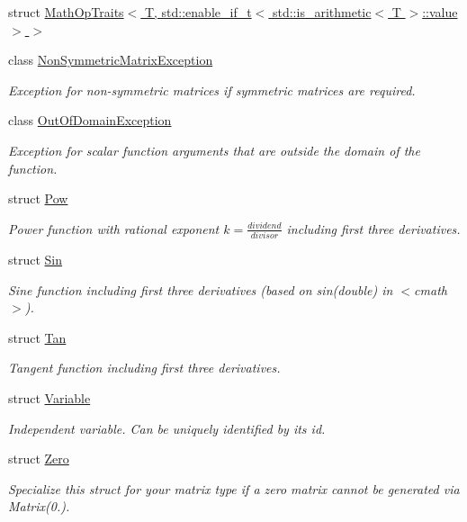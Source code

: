 \begin{DoxyCompactItemize}
\item 
struct \hyperlink{structFunG_1_1MathOpTraits_3_01T_00_01std_1_1enable__if__t_3_01std_1_1is__arithmetic_3_01T_01_4_1_1value_01_4_01_4}{Math\+Op\+Traits$<$ T, std\+::enable\+\_\+if\+\_\+t$<$ std\+::is\+\_\+arithmetic$<$ T $>$\+::value $>$ $>$}
\item 
class \hyperlink{classFunG_1_1NonSymmetricMatrixException}{Non\+Symmetric\+Matrix\+Exception}
\begin{DoxyCompactList}\small\item\em Exception for non-\/symmetric matrices if symmetric matrices are required. \end{DoxyCompactList}\item 
class \hyperlink{classFunG_1_1OutOfDomainException}{Out\+Of\+Domain\+Exception}
\begin{DoxyCompactList}\small\item\em Exception for scalar function arguments that are outside the domain of the function. \end{DoxyCompactList}\item 
struct \hyperlink{structFunG_1_1Pow}{Pow}
\begin{DoxyCompactList}\small\item\em Power function with rational exponent $ k = \frac{dividend}{divisor} $ including first three derivatives. \end{DoxyCompactList}\item 
struct \hyperlink{structFunG_1_1Sin}{Sin}
\begin{DoxyCompactList}\small\item\em Sine function including first three derivatives (based on sin(double) in $<$cmath$>$). \end{DoxyCompactList}\item 
struct \hyperlink{structFunG_1_1Tan}{Tan}
\begin{DoxyCompactList}\small\item\em Tangent function including first three derivatives. \end{DoxyCompactList}\item 
struct \hyperlink{structFunG_1_1Variable}{Variable}
\begin{DoxyCompactList}\small\item\em Independent variable. Can be uniquely identified by its id. \end{DoxyCompactList}\item 
struct \hyperlink{structFunG_1_1Zero}{Zero}
\begin{DoxyCompactList}\small\item\em Specialize this struct for your matrix type if a zero matrix cannot be generated via Matrix(0.). \end{DoxyCompactList}\item 

\end{DoxyCompactItemize}
